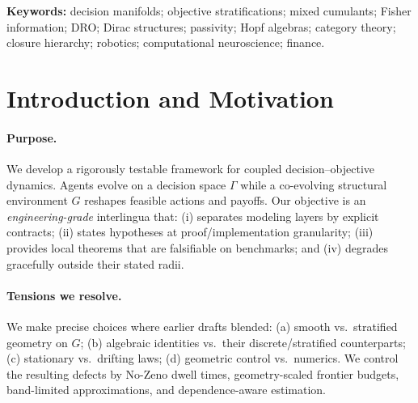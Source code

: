 \documentclass[10pt]{article}
\begin{document}
\begin{abstract}
We present a candidate interlingua for decision--objective systems, built on bigraded multivectors, mixed cumulants, and algebraic/categorical closure. Relative to prior drafts, we \emph{commit to a stratified-smooth calculus on $G$} with precise frontier-compatibility axioms; we add existence/regularity assumptions for the stochastic semantics; we make the local entropy--cumulant bound \emph{coordinate invariant} via the Fisher metric and an explicit finite dictionary of sufficient statistics; we define a \emph{Dirac (power-preserving) projection $\Pi$} and state a compositional passivity--ISS theorem; and we adopt a \emph{distributionally robust (DRO) closure} objective for drift. We also make plane selection explicit as an SVD eigen-problem with degeneracy regularization, define DEC-compatible shape derivatives with a finite-difference estimator and variance bound, introduce block/bootstrap procedures for dependent data, quantify chart-induced bias/variance, fix invariance choices, specify a concrete Hopf object (quasi-shuffle on $(p,q)$-words) with a worked $\kappa_{2,1}$ example, and derive Lipschitz category constants.
\end{abstract}

\textbf{Keywords:} decision manifolds; objective stratifications; mixed cumulants; Fisher information; DRO; Dirac structures; passivity; Hopf algebras; category theory; closure hierarchy; robotics; computational neuroscience; finance.

\section{Introduction and Motivation}\label{sec:intro}

\paragraph{Purpose.}
We develop a rigorously testable framework for coupled decision--objective dynamics. Agents evolve on a decision space $\Gamma$ while a co-evolving structural environment $G$ reshapes feasible actions and payoffs. Our objective is an \emph{engineering-grade} interlingua that: (i) separates modeling layers by explicit contracts; (ii) states hypotheses at proof/implementation granularity; (iii) provides local theorems that are falsifiable on benchmarks; and (iv) degrades gracefully outside their stated radii.

\paragraph{Tensions we resolve.}
We make precise choices where earlier drafts blended: (a) smooth vs.\ stratified geometry on $G$; (b) algebraic identities vs.\ their discrete/stratified counterparts; (c) stationary vs.\ drifting laws; (d) geometric control vs.\ numerics. We control the resulting defects by No-Zeno dwell times, geometry-scaled frontier budgets, band-limited approximations, and dependence-aware estimation.
\end{document}

